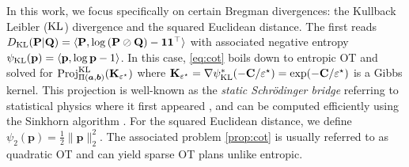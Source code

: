 In this work, we focus specifically on 
certain Bregman divergences: the Kullback Leibler ($\operatorname{KL}$) divergence and the squared Euclidean distance.
The first reads $D_{\operatorname{KL}}({\mathbf{P}} | {\mathbf{Q}}) = \langle {\mathbf{P}}, \log \left({\mathbf{P}} \oslash {\mathbf{Q}} \right) - \bm{1} \bm{1}^\top \rangle$ with associated negative entropy $\psi_{\operatorname{KL}}(\mathbf{p}) = \langle \mathbf{p}, \log \mathbf{p} - 1 \rangle$. In this case, \eqref{eq:cot} boils down to entropic OT and solved for $\operatorname{Proj}^{\operatorname{KL}}_{\Pi(\bm{a}, \bm{b})}({\mathbf{K}}_{\varepsilon^\star})$ where ${\mathbf{K}}_{\varepsilon^\star} = \nabla \psi_{\operatorname{KL}}^{*}(-{\mathbf{C}} / \varepsilon^\star) = \exp(-{\mathbf{C}} / \varepsilon^\star)$ is a Gibbs kernel. This projection is well-known as the \emph{static Schrödinger bridge} \cite{leonard2013survey} referring to statistical physics where it first appeared \cite{schrodinger1931umkehrung}, and can be computed efficiently using the Sinkhorn algorithm \cite{cuturi2013sinkhorn}. For the squared Euclidean distance, we define $\psi_{2}(\mathbf{p}) = \frac{1}{2} \| \mathbf{p} \|^2_2$. The associated problem \eqref{prop:cot} is usually referred to as quadratic OT \cite{lorenz2021quadratically} and can yield sparse OT plans unlike entropic.

